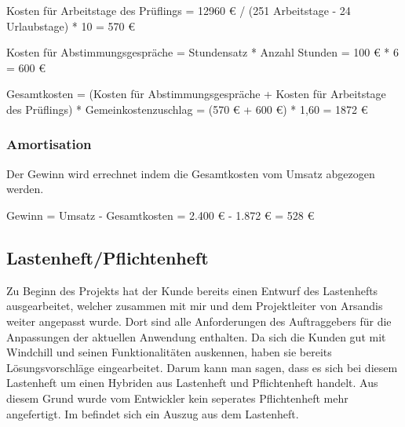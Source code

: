 Kosten für Arbeitstage des Prüflings = 12960 € / (251 Arbeitstage - 24 Urlaubstage) * 10 = 570 €

Kosten für Abstimmungsgespräche = Stundensatz * Anzahl Stunden = 100 € * 6 = 600 €

Gesamtkosten = (Kosten für Abstimmungsgespräche + Kosten für Arbeitstage des Prüflings) * Gemeinkostenzuschlag = (570 € + 600 €) * 1,60 = 1872 €

\subsubsection{Amortisation}
Der Gewinn wird errechnet indem die Gesamtkosten vom Umsatz abgezogen werden.

Gewinn = Umsatz - Gesamtkosten = 2.400 € - 1.872 € = 528 €

\subsection{Lastenheft/Pflichtenheft}
\label{sec:Lastenheft}
Zu Beginn des Projekts hat der Kunde bereits einen Entwurf des Lastenhefts ausgearbeitet, welcher zusammen mit mir und dem Projektleiter von Arsandis weiter angepasst wurde.
Dort sind alle Anforderungen des Auftraggebers für die Anpassungen der aktuellen Anwendung enthalten.
Da sich die Kunden gut mit Windchill und seinen Funktionalitäten auskennen, haben sie bereits Lösungsvorschläge eingearbeitet.
Darum kann man sagen, dass es sich bei diesem Lastenheft um einen Hybriden aus Lastenheft und Pflichtenheft handelt.
Aus diesem Grund wurde vom Entwickler kein seperates Pflichtenheft mehr angefertigt.
Im  befindet sich ein Auszug aus dem Lastenheft.
